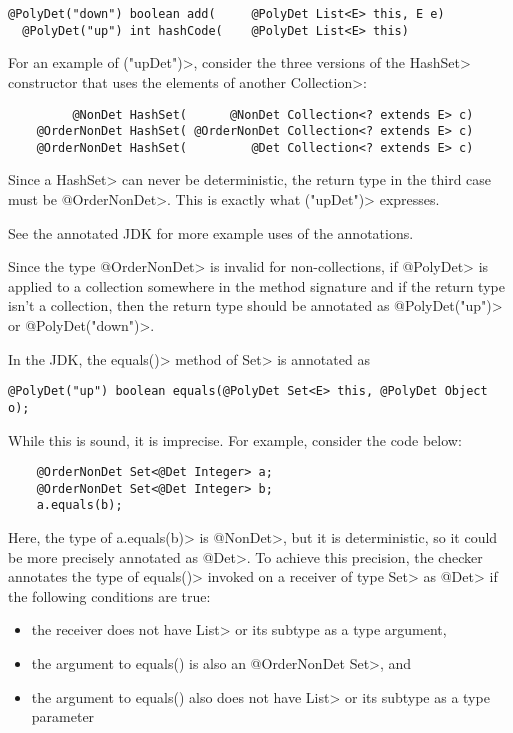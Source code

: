 \begin{Verbatim}
@PolyDet("down") boolean add(     @PolyDet List<E> this, E e)
  @PolyDet("up") int hashCode(    @PolyDet List<E> this)
\end{Verbatim}

For an example of \<("upDet")>,
consider the three versions of the \<HashSet> constructor that uses the elements
of another \<Collection>:

\begin{Verbatim}
         @NonDet HashSet(      @NonDet Collection<? extends E> c)
    @OrderNonDet HashSet( @OrderNonDet Collection<? extends E> c)
    @OrderNonDet HashSet(         @Det Collection<? extends E> c)
\end{Verbatim}

Since a \<HashSet> can never be deterministic, the return type in the third case
must be \<@OrderNonDet>. This is exactly what
\<("upDet")> expresses.

See the annotated JDK for more example uses of the annotations.

Since the type \<@OrderNonDet> is invalid for non-collections,
if \<@PolyDet> is applied to a collection somewhere in the method signature
and if the return type isn't a collection, then the return type should be
annotated as \<@PolyDet("up")> or \<@PolyDet("down")>.


In the JDK, the \<equals()> method of \<Set> is annotated as
\begin{Verbatim}
@PolyDet("up") boolean equals(@PolyDet Set<E> this, @PolyDet Object o);
\end{Verbatim}
While this is sound, it is imprecise.
For example, consider the code below:

\begin{Verbatim}
    @OrderNonDet Set<@Det Integer> a;
    @OrderNonDet Set<@Det Integer> b;
    a.equals(b);
\end{Verbatim}

Here, the type of \<a.equals(b)> is \<@NonDet>,
but it is deterministic, so it could be more precisely annotated as \<@Det>.
To achieve this precision, the checker annotates the type
of \<equals()> invoked on a receiver of type \<Set> as \<@Det> if the
following conditions are true:
\begin{itemize}
    \item the receiver does not have \<List> or its subtype as a type argument,
    \item the argument to equals() is also an \<@OrderNonDet Set>, and
    \item the argument to equals() also does not have \<List> or its subtype as a
    type parameter
\end{itemize}

